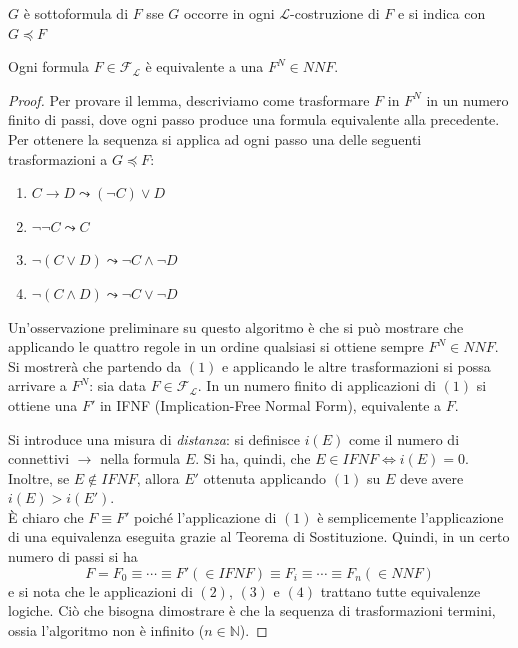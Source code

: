 \begin{defi}[Sottoformula]
$G$ è sottoformula di $F$ sse $G$ occorre in ogni $\mathscr{L}$-costruzione di $F$ e si indica con $G \preccurlyeq F$
\end{defi}

\begin{lem}
Ogni formula $F \in \mathscr{F_L}$ è equivalente a una $F^{N} \in NNF$. 
\end{lem}
\begin{proof}
Per provare il lemma, descriviamo come trasformare $F$ in $F^{N}$ in un numero 
finito di passi, dove ogni passo produce una formula equivalente alla precedente. 
Per ottenere la sequenza si applica ad ogni passo una delle seguenti 
trasformazioni a $G \preccurlyeq F$:

\begin{enumerate}
  \item $C \rightarrow D \leadsto (\neg C) \lor D$
  \item $\neg \neg C \leadsto C$
  \item $\neg(C \lor D) \leadsto \neg C \land \neg D$
  \item $\neg (C \land D) \leadsto \neg C \lor \neg D$
\end{enumerate}

Un'osservazione preliminare su questo algoritmo è che si può mostrare che applicando 
le quattro regole in un ordine qualsiasi si ottiene sempre $F^{N} \in NNF$. 
Si mostrerà che partendo da $(1)$ e applicando le altre trasformazioni si possa 
arrivare a $F^{N}$: sia data $F \in \mathscr{F_L}$. In un numero finito di applicazioni 
di $(1)$ si ottiene una $F'$ in IFNF (Implication-Free Normal Form), equivalente 
a $F$. 

Si introduce una misura di \textit{distanza}: si definisce 
$i(E)$ come il numero di connettivi $\rightarrow$ nella formula $E$. 
Si ha, quindi, 
che $E \in IFNF \iff i(E) = 0$. Inoltre, se $E \notin IFNF$, allora 
$E'$ ottenuta applicando $(1)$ su $E$ deve avere $i(E) > i(E')$.\\
È chiaro che $F \equiv F'$ poiché l'applicazione di $(1)$ è semplicemente 
l'applicazione di una equivalenza eseguita grazie al Teorema di Sostituzione. 
Quindi, in un certo numero di passi  si ha
$$ 
F = F_0 \equiv \cdots \equiv F' (\in IFNF) \equiv F_i \equiv \cdots \equiv F_n (\in NNF)
$$
e si nota che le applicazioni di $(2)$, $(3)$ e $(4)$ trattano tutte equivalenze logiche. Ciò che bisogna dimostrare è che la sequenza di trasformazioni termini, ossia l'algoritmo non è infinito ($n \in \mathbb{N}$).


\end{proof}
